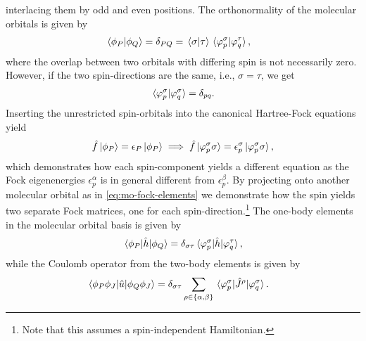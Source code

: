             interlacing them by odd and even positions.
            The orthonormality of the molecular orbitals is given by
            \begin{align}
                \braket*{\phi_P}{\phi_Q}
                &= \delta_{PQ}
                = \braket*{\sigma}{\tau}
                \braket*{\varphi^{\sigma}_{p}}{\varphi^{\tau}_{q}},
            \end{align}
            where the overlap between two orbitals with differing spin is not
            necessarily zero.
            However, if the two spin-directions are the same, i.e., $\sigma =
            \tau$, we get
            \begin{align}
                \braket*{\varphi^{\sigma}_{p}}{\varphi^{\sigma}_{q}}
                = \delta_{pq}.
            \end{align}
            Inserting the unrestricted spin-orbitals into the canonical
            Hartree-Fock equations yield
            \begin{align}
                \hat{f}\ket*{\phi_P}
                = \epsilon_P\ket*{\phi_P}
                \implies
                \hat{f}\ket*{\varphi^{\sigma}_{p}\sigma}
                = \epsilon^{\sigma}_{p}\ket*{\varphi^{\sigma}_{p} \sigma},
            \end{align}
            which demonstrates how each spin-component yields a different
            equation as the Fock eigenenergies $\epsilon^{\alpha}_{p}$ is in
            general different from $\epsilon^{\beta}_{p}$.
            By projecting onto another molecular orbital as in
            \autoref{eq:mo-fock-elements} we demonstrate how the spin yields two
            separate Fock matrices, one for each spin-direction.\footnote{%
                Note that this assumes a spin-independent Hamiltonian.
            }
            The one-body elements in the molecular orbital basis is given by
            \begin{align}
                \mel*{\phi_P}{\hat{h}}{\phi_Q}
                = \delta_{\sigma\tau}
                \mel*{\varphi^{\sigma}_{p}}{
                    \hat{h}
                }{\varphi^{\tau}_{q}},
            \end{align}
            while the Coulomb operator from the two-body elements is given by
            \begin{align}
                \mel*{\phi_P\phi_J}{
                    \hat{u}
                }{\phi_Q\phi_J}
                &=
                \delta_{\sigma\tau}
                \sum_{\rho \in \left\{ \alpha, \beta \right\}}
                \mel*{\varphi^{\sigma}_{p}}{
                    \hat{J}^{\rho}
                }{\varphi^{\sigma}_{q}}.
            \end{align}
